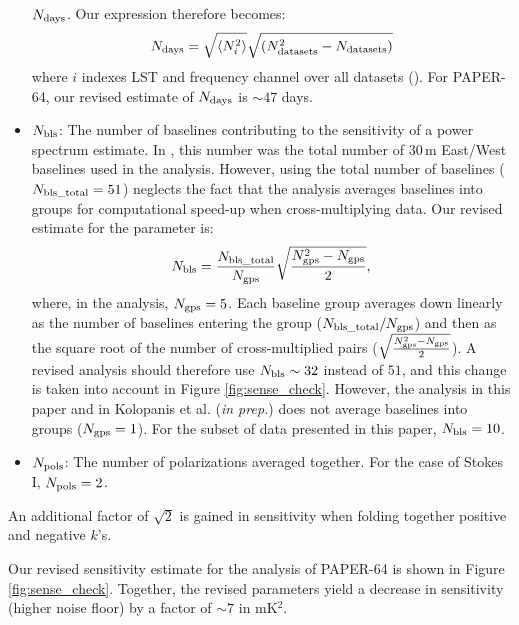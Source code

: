 \documentclass[preprint2,numberedappendix,tighten]{aastex6}  %
\begin{document}
\begin{itemize}
$N_{\rm days}$. Our expression therefore becomes:
\begin{equation}
N_{\rm days} = \sqrt{\langle N_{i}^{2}\rangle} \sqrt{(N_{\rm datasets}^{2}-N_{\rm datasets})}
 \end{equation}
\noindent where $i$ indexes LST and frequency channel over all datasets (\citealt{jacobs_et_al2015}). For PAPER-64, our revised estimate of $N_{\rm days}$ is $\sim47$ 
days.
\item $N_{\rm bls}$: The number of baselines contributing to the sensitivity of a power spectrum estimate. In , this number was 
the total number of $30$\,m East/West baselines used in the analysis. However, using the total number of baselines ($N_{\rm bls\_total} = 51$) neglects 
the fact that the  analysis averages baselines into groups for computational speed-up when cross-multiplying data. Our revised estimate for the parameter is:
\begin{equation}
N_{\rm bls} = \frac{N_{\rm bls\_total}}{N_{\rm gps}}\sqrt{\frac{N_{\rm gps}^{2}-N_{\rm gps}}{2}},
\end{equation}
\noindent where, in the  analysis, $N_{\rm gps} = 5$. Each baseline group averages down linearly as the number of baselines 
entering the group ($N_{\rm bls\_total}/N_{\rm gps}$) and then as the square root of the number of cross-multiplied pairs \Big($\sqrt{\frac{N_{\rm gps}^{2} - 
N_{\rm gps}}{2}}$\Big). A revised  analysis should therefore use $N_{\rm bls} \sim 32$ instead of $51$, and this change is taken into account in Figure \ref{fig:sense_check}. However, the analysis in this paper and in Kolopanis et al. (\textit{in prep.}) does not average baselines into groups ($N_{\rm gps} = 1$). For the subset of data presented in this paper, $N_{\rm bls} = 10$.
\item $N_{\rm pols}$: The number of polarizations averaged together. For the case of Stokes I, $N_{\rm pols}=2$.
\end{itemize}

An additional factor of $\sqrt{2}$ is gained in sensitivity when folding together positive and negative $k$'s. 

Our revised sensitivity estimate for the  analysis of PAPER-64 is shown in Figure \ref{fig:sense_check}. 
Together, the revised parameters yield a decrease in sensitivity (higher noise floor) by a factor of $\sim7$ in mK$^{2}$. 
\end{document}
